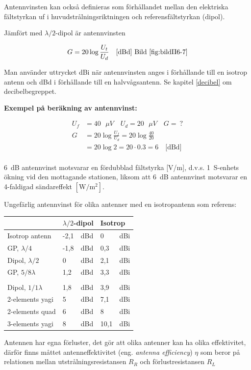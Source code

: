 Antennvinsten kan också definieras som förhållandet mellan den elektriska
fältstyrkan uf i huvudstrålningsriktningen och referensfältstyrkan (dipol).

Jämfört med \(\lambda/2\)-dipol är antennvinsten

\[G = 20 \log\frac{U_t}{U_d} \quad \text{[dBd] Bild \ref{fig:bildII6-7}}\]

Man använder uttrycket dBi när antennvinsten anges i förhållande till
en isotrop antenn och dBd i förhållande till en halvvågsantenn.
Se kapitel \ref{decibel} om decibelbegreppet.

\textbf{Exempel på beräkning av antennvinst:}

\begin{align*}
  U_f &= 40\text{ \(\mu V\)} \quad U_d = 20\text{ \(\mu V\)} \quad G =\ ? \\
  G &= 20 \log\frac{U_f}{U_d} = 20 \log\frac{40}{20} \\
  &= 20 \log 2 = 20\cdot 0.3 = 6 \quad \text{[dBd]} \\
\end{align*}

6~dB antennvinst motsvarar en fördubblad fältstyrka [V/m], d.v.s. 1~S-enhets
ökning vid den mottagande stationen, liksom att 6~dB antennvinst motsvarar
en 4-faldigad sändareffekt \(\mathrm{[W/m^2]}\).

Ungefärlig antennvinst för olika antenner med en isotropantenn som referens:

\begin{tabular}{l|ll|ll}
  & \multicolumn{2}{l|}{\(\lambda/2\)-dipol} &
  \multicolumn{2}{l}{Isotrop} \\
  \hline
  Isotrop antenn       & -2,1 & dBd & 0   & dBi \\
  GP, \(\lambda/4\)    & -1,8 & dBd & 0,3 & dBi \\
  Dipol, \(\lambda/2\) & 0    & dBd & 2,1 & dBi \\
  GP, \(5/8\lambda\)   & 1,2  & dBd & 3,3 & dBi \\
  & & & & \\
  Dipol, \(1/1\lambda\) & 1,8 & dBd & 3,9  & dBi \\
  2-elements yagi       & 5   & dBd & 7,1  & dBi \\
  2-elements quad       & 6   & dBd & 8    & dBi \\
  3-elements yagi       & 8   & dBd & 10,1 & dBi \\
\end{tabular}

Antennen har egna förluster, det gör att olika antenner kan ha olika
effektivitet, därför finns måttet antenneffektivitet
(eng. \emph{antenna efficiency}) \(\eta\) som beror på relationen mellan
utstrålningsresistansen \(R_R\) och förlustresistansen \(R_L\)

